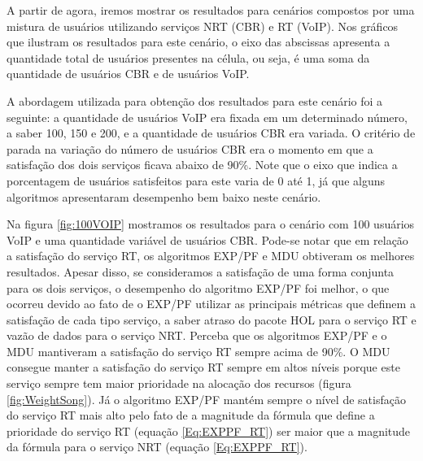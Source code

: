 A partir de agora, iremos mostrar os resultados para cenários compostos por uma mistura de usuários utilizando serviços NRT (CBR) e RT (VoIP). Nos gráficos que ilustram os resultados para este cenário, o eixo das abscissas apresenta a quantidade total de usuários presentes na célula, ou seja, é uma soma da quantidade de usuários CBR e de usuários VoIP. 

A abordagem utilizada para obtenção dos resultados para este cenário foi a seguinte: a quantidade de usuários VoIP era fixada em um determinado número, a saber 100, 150 e 200, e a quantidade de usuários CBR era variada. O critério de parada na variação do número de usuários CBR era o momento em que a satisfação dos dois serviços ficava abaixo de 90\%. Note que o eixo que indica a porcentagem de usuários satisfeitos para este varia de 0 até 1, já que alguns algoritmos apresentaram desempenho bem baixo neste cenário. 

Na figura \ref{fig:100VOIP} mostramos os resultados para o cenário com 100 usuários VoIP e uma quantidade variável de usuários CBR. Pode-se notar que em relação a satisfação do serviço RT, os algoritmos EXP/PF e MDU obtiveram os melhores resultados. Apesar disso, se consideramos a satisfação de uma forma conjunta para os dois serviços, o desempenho do algoritmo EXP/PF foi melhor, o que ocorreu devido ao fato de o EXP/PF utilizar as principais métricas que definem a satisfação de cada tipo serviço, a saber atraso do pacote HOL para o serviço RT e vazão de dados para o serviço NRT. Perceba que os algoritmos EXP/PF e o MDU mantiveram a satisfação do serviço RT sempre acima de 90\%. O MDU consegue manter a satisfação do serviço RT sempre em altos níveis porque este serviço sempre tem maior prioridade na alocação dos recursos (figura \ref{fig:WeightSong}). Já o algoritmo EXP/PF mantém sempre o nível de satisfação do serviço RT mais alto pelo fato de a magnitude da fórmula que define a prioridade do serviço RT (equação \ref{Eq:EXPPF_RT}) ser maior que a magnitude da fórmula para o serviço NRT (equação \ref{Eq:EXPPF_RT}). 

